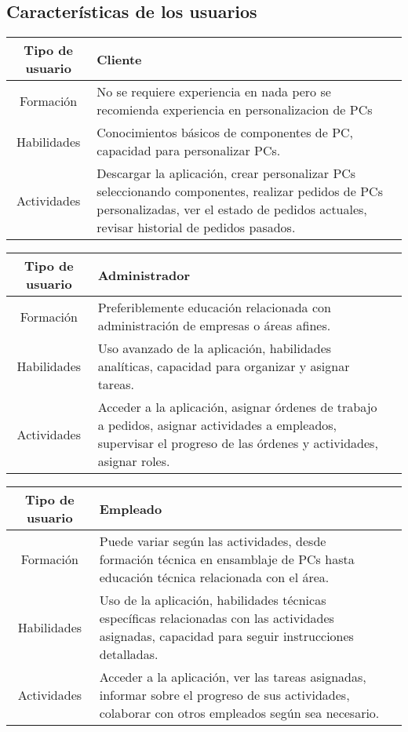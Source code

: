 \documentclass[12pt,a4paper, twosite]{article}
\begin{document}
\subsection{Características de los usuarios}
\label{sec:orga40b0ee}
\vspace{10pt}

\begin{tabular}{|c|p{12cm}|c|}
  \hline
  Tipo de usuario & Cliente \\
  \hline
  Formación & No se requiere experiencia en nada pero se recomienda experiencia en personalizacion de PCs \\
  \hline
  Habilidades & Conocimientos básicos de componentes de PC, capacidad para personalizar PCs. \\
  \hline
  Actividades & Descargar la aplicación, crear personalizar PCs seleccionando componentes, realizar pedidos de PCs personalizadas, ver el estado de pedidos actuales, revisar historial de pedidos pasados. \\
  \hline
\end{tabular}
\vspace{10pt}

\begin{tabular}{|c|p{12cm}|c|}
  \hline
  Tipo de usuario & Administrador \\
  \hline
  Formación & Preferiblemente educación relacionada con administración de empresas o áreas afines. \\
  \hline
  Habilidades & Uso avanzado de la aplicación, habilidades analíticas, capacidad para organizar y asignar tareas. \\
  \hline
  Actividades & Acceder a la aplicación, asignar órdenes de trabajo a pedidos, asignar actividades a empleados, supervisar el progreso de las órdenes y  actividades, asignar roles. \\
  \hline
\end{tabular}
\vspace{10pt}

\begin{tabular}{|c|p{12cm}|c|}
  \hline
  Tipo de usuario & Empleado \\
  \hline
  Formación & Puede variar según las actividades, desde formación técnica en ensamblaje de PCs hasta educación técnica relacionada con el área. \\
  \hline
  Habilidades & Uso de la aplicación, habilidades técnicas específicas relacionadas con las actividades asignadas, capacidad para seguir instrucciones detalladas. \\
  \hline
  Actividades & Acceder a la aplicación, ver las tareas asignadas, informar sobre el progreso de sus actividades, colaborar con otros empleados según sea necesario. \\
  \hline
\end{tabular}
\end{document}
